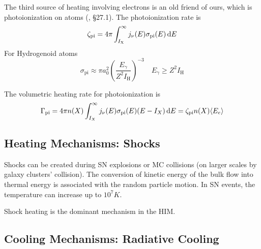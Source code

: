 \par The third source of heating involving electrons is an old friend of ours, which is photoionization on atoms (\cite{2011piim.book.....D}, §27.1). The photoionization rate is 
\begin{equation}
    \zeta_{\text{pi}} = 4\pi \int_{I_{\text{X}}}^{\infty} j_{\nu}(E)\sigma_{\text{pi}}(E)\,\text{d}E
    \label{eq:AT-photoionizationrate}
\end{equation}
For Hydrogenoid atoms 
\begin{equation}
    \sigma_{\text{pi}} \approx \pi a_{0}^{2}\left(\frac{E_{\gamma}}{Z^{2}I_{\text{H}}}\right)^{-3} \quad E_{\gamma} \geq Z^{2}I_{\text{H}}
\end{equation}
\par The volumetric heating rate for photoionization is 
\begin{equation}
    \Gamma_{\text{pi}} = 4\pi n(X)\int_{I_{X}}^{\infty}j_{\nu}(E)\sigma_{\text{pi}}(E)(E-I_{X})\,\text{d}E = \zeta_{\text{pi}}n(X)\langle E_{e} \rangle
\end{equation}

\subsection{Heating Mechanisms: Shocks}

Shocks can be created during SN explosions or MC collisions (on larger scales by galaxy clusters' collision). The conversion of kinetic energy of the bulk flow into thermal energy is associated with the random particle motion. In SN events, the temperature can increase up to $10^{7}\unit{K}$. 
\par Shock heating is the dominant mechanism in the HIM.

\subsection{Cooling Mechanisms: Radiative Cooling}

